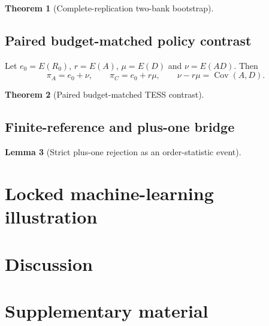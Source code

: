 \documentclass[11pt]{article}
\newtheorem{theorem}{Theorem}
\newtheorem{lemma}[theorem]{Lemma}
\theoremstyle{definition}
\theoremstyle{remark}
\begin{document}
\begin{theorem}[Complete-replication two-bank bootstrap]
\end{theorem}

\subsection{Paired budget-matched policy contrast}
Let $e_0=E(R_0)$, $r=E(A)$, $\mu=E(D)$ and $\nu=E(AD)$. Then
\[
\pi_A=e_0+\nu,\qquad
\pi_C=e_0+r\mu,\qquad
\nu-r\mu=\operatorname{Cov}(A,D).
\]

\begin{theorem}[Paired budget-matched TESS contrast]
\end{theorem}

\subsection{Finite-reference and plus-one bridge}
\begin{lemma}[Strict plus-one rejection as an order-statistic event]
\end{lemma}

\section{Locked machine-learning illustration}

\section{Discussion}

\section*{Supplementary material}



\end{document}
